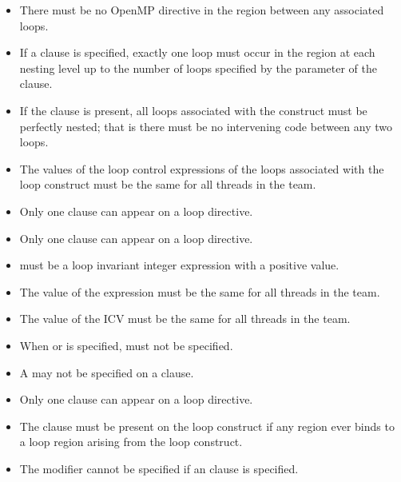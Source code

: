 \begin{itemize}
\item There must be no OpenMP directive in the region between any
associated loops.

\item If a  clause is specified, exactly one loop must
occur in the region at each nesting level up to the number of loops
specified by the parameter of the  clause.

\item If the  clause is present, all loops associated
with the construct must be perfectly nested; that is there must be
no intervening code between any two loops.

\item The values of the loop control expressions of the loops associated with the loop 
construct must be the same for all threads in the team.

\item Only one  clause can appear on a loop directive.

\item Only one  clause can appear on a loop directive.

\item {} must be a loop invariant integer expression with a positive value.

\item The value of the  expression must be the same for all threads in the team.

\item The value of the  ICV must be the same for all threads in the team.

\item When  or  is specified,  must 
not be specified.

\item A  may not be specified on a  clause.

\item Only one  clause can appear on a loop directive.

\item The  clause must be present on the loop construct if any  region 
ever binds to a loop region arising from the loop construct.

\item The  modifier cannot be specified if an  clause is specified.


\end{itemize}
